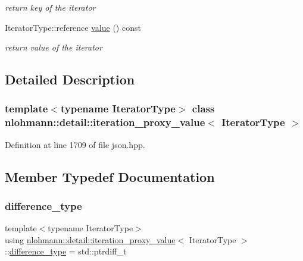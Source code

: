 \begin{DoxyCompactItemize}
\begin{DoxyCompactList}\small\item\em return key of the iterator \end{DoxyCompactList}\item 
Iterator\+Type\+::reference \mbox{\hyperlink{classnlohmann_1_1detail_1_1iteration__proxy__value_ab8e33bd01c285a1a80b737a1905ceb97}{value}} () const
\begin{DoxyCompactList}\small\item\em return value of the iterator \end{DoxyCompactList}\end{DoxyCompactItemize}


\subsection{Detailed Description}
\subsubsection*{template$<$typename Iterator\+Type$>$\newline
class nlohmann\+::detail\+::iteration\+\_\+proxy\+\_\+value$<$ Iterator\+Type $>$}



Definition at line 1709 of file json.\+hpp.



\subsection{Member Typedef Documentation}
\mbox{\label{classnlohmann_1_1detail_1_1iteration__proxy__value_ada6b4e6d55d8ed7ac79e49a03e9d1fe2}} 
\subsubsection{\texorpdfstring{difference\_type}{difference\_type}}
{\footnotesize\ttfamily template$<$typename Iterator\+Type$>$ \\
using \mbox{\hyperlink{classnlohmann_1_1detail_1_1iteration__proxy__value}{nlohmann\+::detail\+::iteration\+\_\+proxy\+\_\+value}}$<$ Iterator\+Type $>$\+::\mbox{\hyperlink{classnlohmann_1_1detail_1_1iteration__proxy__value_ada6b4e6d55d8ed7ac79e49a03e9d1fe2}{difference\+\_\+type}} =  std\+::ptrdiff\+\_\+t}



